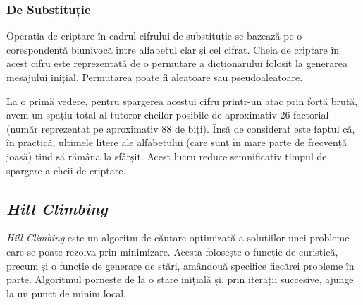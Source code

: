 \documentclass{article}
\begin{document}
\subsubsection{De Substituție}

Operația de criptare în cadrul cifrului de substituție se bazează pe o corespondență biunivocă între alfabetul clar și cel cifrat. Cheia de criptare în acest cifru este reprezentată de o permutare a dicționarului folosit la generarea mesajului inițial. Permutarea poate fi aleatoare sau pseudoaleatoare.

\vspace{0.3cm}
\begin{center}
    \label{fig:2}
    \captionsetup{justification=centering,margin=1cm}
\end{center}
\vspace{0.3cm}

\begin{center}
    \label{fig:2}
    \captionsetup{justification=centering,margin=1cm}
\end{center}
\vspace{0.3cm}

La o primă vedere, pentru spargerea acestui cifru printr-un atac prin forță brută, avem un spațiu total al tutoror cheilor posibile de aproximativ 26 factorial (număr reprezentat pe aproximativ 88 de biți). Însă de considerat este faptul că, în practică, ultimele litere ale alfabetului (care sunt în mare parte de frecvență joasă) tind să rămână la sfârșit. Acest lucru reduce semnificativ timpul de spargere a cheii de criptare.

\subsection{\textit{Hill Climbing}}

\textit{Hill Climbing} este un algoritm de căutare optimizată a soluțiilor unei probleme care se poate rezolva prin minimizare. Acesta folosește o funcție de euristică, precum și o funcție de generare de stări, amândouă specifice fiecărei probleme în parte. Algoritmul pornește de la o stare inițială și, prin iterații succesive, ajunge la un punct de minim local.
\end{document}
